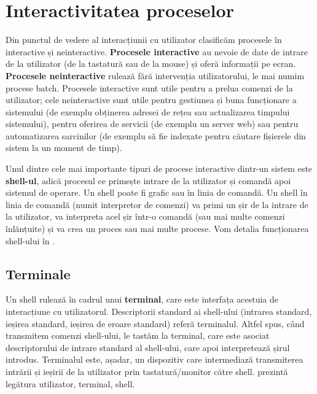 \section{Interactivitatea proceselor}
\label{sec:procese-interactivitate}

Din punctul de vedere al interacțiunii cu utilizator clasificăm procesele în
interactive și neinteractive. \textbf{Procesele interactive} au nevoie de date de intrare
de la utilizator (de la tastatură sau de la mouse) și oferă informații pe ecran.
\textbf{Procesele neinteractive} rulează fără intervenția utilizatorului, le mai numim procese
batch. Procesele interactive sunt utile pentru a prelua comenzi de la
utilizator; cele neinteractive sunt utile pentru gestiunea și buna funcționare a
sistemului (de exemplu obținerea adresei de rețea sau actualizarea timpului
sistemului), pentru oferirea de servicii (de exemplu un server web) sau pentru
automatizarea sarcinilor (de exemplu să fie indexate pentru căutare fișierele
din sistem la un moment de timp).

Unul dintre cele mai importante tipuri de procese interactive dintr-un sistem
este \textbf{shell-ul}, adică procesul ce primește intrare de la utilizator și comandă
apoi sistemul de operare. Un shell poate fi grafic sau în linia de comandă. Un
shell în linia de comandă (numit interpretor de comenzi) va primi un șir de la
intrare de la utilizator, va interpreta acel șir într-o comandă (sau mai multe
comenzi înlănțuite) și va crea un proces sau mai multe procese. Vom detalia
funcționarea shell-ului în .

\subsection{Terminale}
\label{sec:procese-interactivitate-terminale}

Un shell rulează în cadrul unui \textbf{terminal}, care este interfața acestuia de
interacțiune cu utilizatorul. Descriptorii standard ai shell-ului (intrarea
standard, ieșirea standard, ieșirea de eroare standard) referă terminalul.
Altfel spus, când transmitem comenzi shell-ului, le tastăm la terminal, care
este asociat descriptorului de intrare standard al shell-ului, care apoi
interpretează șirul introdus. Terminalul este, așadar, un dispozitiv care
intermediază transmiterea intrării și ieșirii de la utilizator prin tastatură/monitor către
shell.  prezintă legătura utilizator, terminal, shell.


